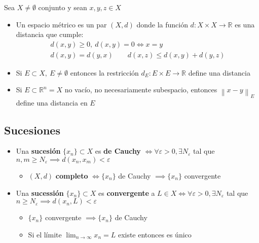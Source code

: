 \documentclass[a4paper,twocolumn]{extarticle}
\newcommand{\R}{\mathbb{R}}
\newcommand{\norma}[1]{\left\lVert#1\right\rVert}
\begin{document}
Sea $X \neq \emptyset$ conjunto y sean $x, y, z \in X$
\begin{itemize}
	\item Un espacio métrico es un par $(X, d)$ donde la función $d:X \times X \to \R$ es una distancia que cumple:
	\begin{align*}
		d(x,y) \geq 0,\ d(x,y) = 0 \iff x = y \\
		d(x,y) = d(y,x) \qquad d(x,z) \leq d(x,y) + d(y,z)
	\end{align*}
	\item Si $E \subset X,\ E \neq \emptyset$ entonces la restricción $d_E: E \times E \to \R$ define una distancia
	\item Si $E \subset \R^n = X$ no vacío, no necesariamente subespacio, entonces $\norma{x - y}_E$ define una distancia en $E$
\end{itemize}


\subsection{Sucesiones}
\begin{itemize}
	\item Una \textbf{sucesión} $\{x_n\} \subset X$ es \textbf{de Cauchy} $\iff \forall \varepsilon > 0, \exists N_\varepsilon$ tal que $n, m \geq N_\varepsilon \implies d(x_n, x_m) < \varepsilon$
	\begin{itemize}
		\item $(X, d)$ \textbf{completo} $\iff \{x_n\}$ de Cauchy $\implies \{x_n\}$ convergente
	\end{itemize}
	\item Una \textbf{sucessión} $\{x_n\} \subset X$ es \textbf{convergente} a $L \in X \iff \forall \varepsilon > 0, \exists N_\varepsilon$ tal que $n \geq N_\varepsilon \implies d(x_n, L) < \varepsilon$
	\begin{itemize}
		\item $\{x_n\}$ convergente $\implies \{x_n\}$ de Cauchy
		\item Si el límite $\lim_{n \to \infty} x_n = L$ existe entonces es único
	\end{itemize}
\end{itemize}
\end{document}
